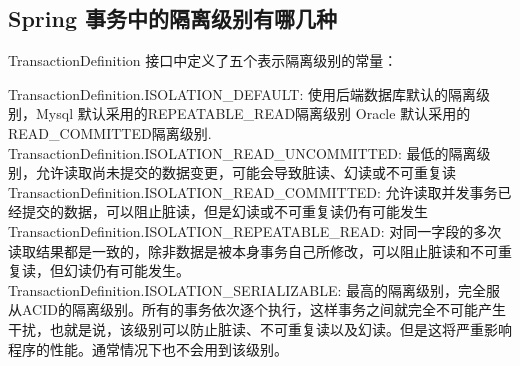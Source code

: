 \documentclass[../../../interview-questions.tex]{subfiles}
\begin{document}
\subsection{Spring 事务中的隔离级别有哪几种}

TransactionDefinition 接口中定义了五个表示隔离级别的常量：

TransactionDefinition.ISOLATION\_DEFAULT:  使用后端数据库默认的隔离级别，Mysql 默认采用的REPEATABLE\_READ隔离级别 Oracle 默认采用的 READ\_COMMITTED隔离级别.
TransactionDefinition.ISOLATION\_READ\_UNCOMMITTED: 最低的隔离级别，允许读取尚未提交的数据变更，可能会导致脏读、幻读或不可重复读
TransactionDefinition.ISOLATION\_READ\_COMMITTED:   允许读取并发事务已经提交的数据，可以阻止脏读，但是幻读或不可重复读仍有可能发生
TransactionDefinition.ISOLATION\_REPEATABLE\_READ:  对同一字段的多次读取结果都是一致的，除非数据是被本身事务自己所修改，可以阻止脏读和不可重复读，但幻读仍有可能发生。
TransactionDefinition.ISOLATION\_SERIALIZABLE:   最高的隔离级别，完全服从ACID的隔离级别。所有的事务依次逐个执行，这样事务之间就完全不可能产生干扰，也就是说，该级别可以防止脏读、不可重复读以及幻读。但是这将严重影响程序的性能。通常情况下也不会用到该级别。
\end{document}

